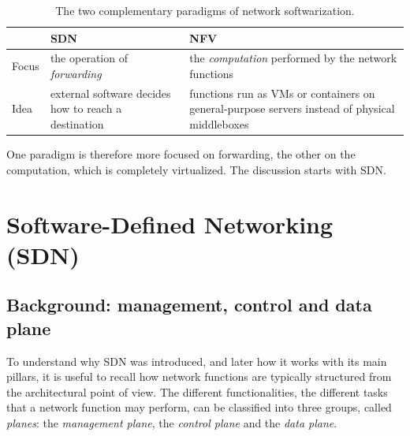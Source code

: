 \begin{table}[h]
\centering
\renewcommand{\arraystretch}{1.25}
\begin{tabular}{@{}>{\raggedright\arraybackslash}p{2.6cm}>{\raggedright\arraybackslash}p{5.3cm}>{\raggedright\arraybackslash}p{5.3cm}@{}}
\toprule
 & \textbf{SDN} & \textbf{NFV} \\
\midrule
Focus & the operation of \emph{forwarding} & the \emph{computation} performed by the network functions \\
Idea & external software decides how to reach a destination & functions run as VMs or containers on general-purpose servers instead of physical middleboxes \\
\bottomrule
\end{tabular}
\caption{The two complementary paradigms of network softwarization.}
\end{table}

One paradigm is therefore more focused on forwarding, the other on the computation, which is completely virtualized. The discussion starts with SDN.

\section{Software-Defined Networking (SDN)}

\subsection{Background: management, control and data plane}

To understand why SDN was introduced, and later how it works with its main pillars, it is useful to recall how network functions are typically structured from the architectural point of view. The different functionalities, the different tasks that a network function may perform, can be classified into three groups, called \emph{planes}: the \emph{management plane}, the \emph{control plane} and the \emph{data plane}.

\begin{center}
\end{center}

